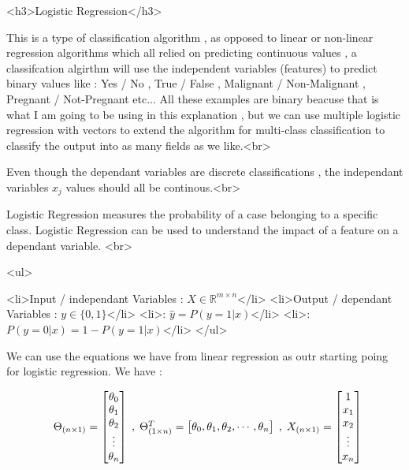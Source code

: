 \subsectionend

<h3>Logistic Regression</h3>

This is a type of classification algorithm , as opposed to linear or non-linear
regression algorithms which all relied on predicting continuous values , a
classifcation algirthm will use the independent variables (features) to predict
binary values like : Yes / No , True / False , Malignant / Non-Malignant ,
Pregnant / Not-Pregnant etc... All these examples are binary beacuse that is
what I am going to be using in this explanation , but we can use multiple
logistic regression with vectors to extend the algorithm for multi-class
classification to classify the output into as many fields as we like.<br>

Even though the dependant variables are discrete classifications , the
independant variables $x_j$ values should all be continous.<br>

Logistic Regression measures the probability of a case belonging to a specific
class. Logistic Regression can be used to understand the impact of a feature on
a dependant variable. <br>

<ul>

	<li>Input / independant Variables : $ X \in \mathbb{R}^{m \times n}$</li>
	<li>Output / dependant Variables : $ y \in \{0,1\}$</li>
	<li>: $ \hat{y} = P(y=1|x) $</li>
	<li>: $ P(y=0|x) = 1 - P(y=1|x) $</li>
</ul>

We can use the equations we have from linear regression as outr starting poing
for logistic regression. We have :

			\[
				\begin{array}{ l@{} l@{}} 
				\Theta_{(n \times 1)} = 
				\begin{bmatrix} 
				\theta_0 \\
				\theta_1 \\
				\theta_2 \\
				\vdots \\
				\theta_n \\ 
				\end{bmatrix} 
				\; , \; 
				\Theta_{(1 \times n)}^{T} = 
				\begin{bmatrix} 
				\theta_0 ,
				\theta_1 ,
				\theta_2 ,
				\cdots , 
				\theta_n
				\end{bmatrix} 
				\; , \; 
				X_{(n \times 1)} = 
				\begin{bmatrix} 
					1 \\
					x_1 \\
					x_2 \\
					\vdots \\
					x_n \\ 
				\end{bmatrix} \\ 
				\end{array}
			\]

